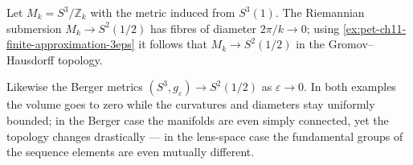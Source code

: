\begin{example}
  \label{ex:pet-ch11-lens-spaces-limit}
  Let $M_k=S^3/\mathbb{Z}_k$ with the metric induced from $S^3(1)$. The
  Riemannian submersion $M_k\to S^2(1/2)$ has fibres of diameter
  $2\pi/k\to0$; using \cref{ex:pet-ch11-finite-approximation-3eps} it follows
  that $M_k\to S^2(1/2)$ in the Gromov--Hausdorff topology.
\end{example}

\begin{example}
  \label{ex:pet-ch11-berger-spheres-limit}
  Likewise the Berger metrics $(S^3,g_\varepsilon)\to S^2(1/2)$ as
  $\varepsilon\to0$. In both examples the volume goes to zero while the
  curvatures and diameters stay uniformly bounded; in the Berger case the
  manifolds are even simply connected, yet the topology changes drastically —
  in the lens-space case the fundamental groups of the sequence elements are
  even mutually different.
\end{example}

